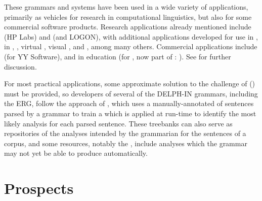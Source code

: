 \documentclass[output=paper
 	        ,biblatex
                ,babelshorthands
                ,newtxmath
                ,draftmode
                ,colorlinks, citecolor=brown
]{langscibook}
\begin{document}
These grammars and systems have been used in a wide variety of applications, primarily as vehicles
for research in computational linguistics, but also for some commercial software products.  Research
applications already mentioned include  (HP Labs) and 
(\verbmobil and LOGON), with additional applications developed for use in 
\citep*{Sch:Kie:Spu:11},  in  \citep*{Hellanetal:13},
 \citep{Herb:Cope:06}, virtual  \citep{packard2014uw},
visual  \citep{DBLP:journals/corr/KuhnleC17}, and 
\citep{Flickinger:17}, among many others.  Commercial applications include  (for YY Software), and  in education (for , now part of : \citealt*{suppes2014teach}).  See
 for further discussion.

For most practical applications, some approximate solution to the challenge of 
() must be provided, so developers of several of the DELPH-IN grammars,
including the ERG, follow the approach of \citet*{OFTM2004a-u}, which uses a manually-annotated
 of sentences parsed by a grammar to train a  which is applied
at run-time to identify the most likely analysis for each parsed sentence.  These treebanks can also
serve as repositories of the analyses intended by the grammarian for the sentences of a corpus, and
some resources, notably the  \citep*{BvNM2001a-u}, include analyses which the
grammar may not yet be able to produce automatically.

\section{Prospects}
\end{document}
